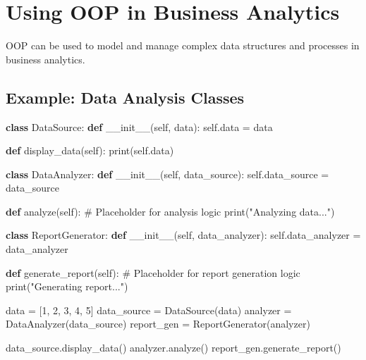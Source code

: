 \documentclass[
  letterpaper,
  DIV=11,
  numbers=noendperiod]{scrreprt}
\newenvironment{Shaded}{\begin{snugshade}}{\end{snugshade}}
\newcommand{\BuiltInTok}[1]{\textcolor[rgb]{0.00,0.23,0.31}{#1}}
\newcommand{\CommentTok}[1]{\textcolor[rgb]{0.37,0.37,0.37}{#1}}
\newcommand{\DecValTok}[1]{\textcolor[rgb]{0.68,0.00,0.00}{#1}}
\newcommand{\FunctionTok}[1]{\textcolor[rgb]{0.28,0.35,0.67}{#1}}
\newcommand{\KeywordTok}[1]{\textcolor[rgb]{0.00,0.23,0.31}{\textbf{#1}}}
\newcommand{\NormalTok}[1]{\textcolor[rgb]{0.00,0.23,0.31}{#1}}
\newcommand{\OperatorTok}[1]{\textcolor[rgb]{0.37,0.37,0.37}{#1}}
\newcommand{\StringTok}[1]{\textcolor[rgb]{0.13,0.47,0.30}{#1}}
\newcommand{\VariableTok}[1]{\textcolor[rgb]{0.07,0.07,0.07}{#1}}
\begin{document}
\section{Using OOP in Business
Analytics}\label{using-oop-in-business-analytics}

OOP can be used to model and manage complex data structures and
processes in business analytics.

\subsection{Example: Data Analysis
Classes}\label{example-data-analysis-classes}

\begin{Shaded}
\begin{Highlighting}[]
\KeywordTok{class}\NormalTok{ DataSource:}
    \KeywordTok{def} \FunctionTok{\_\_init\_\_}\NormalTok{(}\VariableTok{self}\NormalTok{, data):}
        \VariableTok{self}\NormalTok{.data }\OperatorTok{=}\NormalTok{ data}

    \KeywordTok{def}\NormalTok{ display\_data(}\VariableTok{self}\NormalTok{):}
        \BuiltInTok{print}\NormalTok{(}\VariableTok{self}\NormalTok{.data)}

\KeywordTok{class}\NormalTok{ DataAnalyzer:}
    \KeywordTok{def} \FunctionTok{\_\_init\_\_}\NormalTok{(}\VariableTok{self}\NormalTok{, data\_source):}
        \VariableTok{self}\NormalTok{.data\_source }\OperatorTok{=}\NormalTok{ data\_source}

    \KeywordTok{def}\NormalTok{ analyze(}\VariableTok{self}\NormalTok{):}
        \CommentTok{\# Placeholder for analysis logic}
        \BuiltInTok{print}\NormalTok{(}\StringTok{"Analyzing data..."}\NormalTok{)}

\KeywordTok{class}\NormalTok{ ReportGenerator:}
    \KeywordTok{def} \FunctionTok{\_\_init\_\_}\NormalTok{(}\VariableTok{self}\NormalTok{, data\_analyzer):}
        \VariableTok{self}\NormalTok{.data\_analyzer }\OperatorTok{=}\NormalTok{ data\_analyzer}

    \KeywordTok{def}\NormalTok{ generate\_report(}\VariableTok{self}\NormalTok{):}
        \CommentTok{\# Placeholder for report generation logic}
        \BuiltInTok{print}\NormalTok{(}\StringTok{"Generating report..."}\NormalTok{)}

\NormalTok{data }\OperatorTok{=}\NormalTok{ [}\DecValTok{1}\NormalTok{, }\DecValTok{2}\NormalTok{, }\DecValTok{3}\NormalTok{, }\DecValTok{4}\NormalTok{, }\DecValTok{5}\NormalTok{]}
\NormalTok{data\_source }\OperatorTok{=}\NormalTok{ DataSource(data)}
\NormalTok{analyzer }\OperatorTok{=}\NormalTok{ DataAnalyzer(data\_source)}
\NormalTok{report\_gen }\OperatorTok{=}\NormalTok{ ReportGenerator(analyzer)}

\NormalTok{data\_source.display\_data()}
\NormalTok{analyzer.analyze()}
\NormalTok{report\_gen.generate\_report()}
\end{Highlighting}
\end{Shaded}
\end{document}
